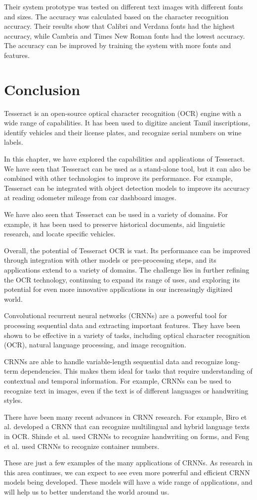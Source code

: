 Their system prototype was tested on different text images with different fonts and sizes. The accuracy was calculated based on the character recognition accuracy. Their results show that Calibri and Verdana fonts had the highest accuracy, while Cambria and Times New Roman fonts had the lowest accuracy.  The accuracy can be improved by training the system with more fonts and features. \cite{hossainOpticalCharacterRecognition2019}

\newpage
\section{Conclusion}

Tesseract is an open-source optical character recognition (OCR) engine with a wide range of capabilities. It has been used to digitize ancient Tamil inscriptions, identify vehicles and their license plates, and recognize serial numbers on wine labels.

In this chapter, we have explored the capabilities and applications of Tesseract. We have seen that Tesseract can be used as a stand-alone tool, but it can also be combined with other technologies to improve its performance. For example, Tesseract can be integrated with object detection models to improve its accuracy at reading odometer mileage from car dashboard images.

We have also seen that Tesseract can be used in a variety of domains. For example, it has been used to preserve historical documents, aid linguistic research, and locate specific vehicles.

Overall, the potential of Tesseract OCR is vast. Its performance can be improved through integration with other models or pre-processing steps, and its applications extend to a variety of domains. The challenge lies in further refining the OCR technology, continuing to expand its range of uses, and exploring its potential for even more innovative applications in our increasingly digitized world.

Convolutional recurrent neural networks (CRNNs) are a powerful tool for processing sequential data and extracting important features. They have been shown to be effective in a variety of tasks, including optical character recognition (OCR), natural language processing, and image recognition.

CRNNs are able to handle variable-length sequential data and recognize long-term dependencies. This makes them ideal for tasks that require understanding of contextual and temporal information. For example, CRNNs can be used to recognize text in images, even if the text is of different languages or handwriting styles.

There have been many recent advances in CRNN research. For example, Biro et al. developed a CRNN that can recognize multilingual and hybrid language texts in OCR. Shinde et al. used CRNNs to recognize handwriting on forms, and Feng et al. used CRNNs to recognize container numbers.

These are just a few examples of the many applications of CRNNs. As research in this area continues, we can expect to see even more powerful and efficient CRNN models being developed. These models will have a wide range of applications, and will help us to better understand the world around us.